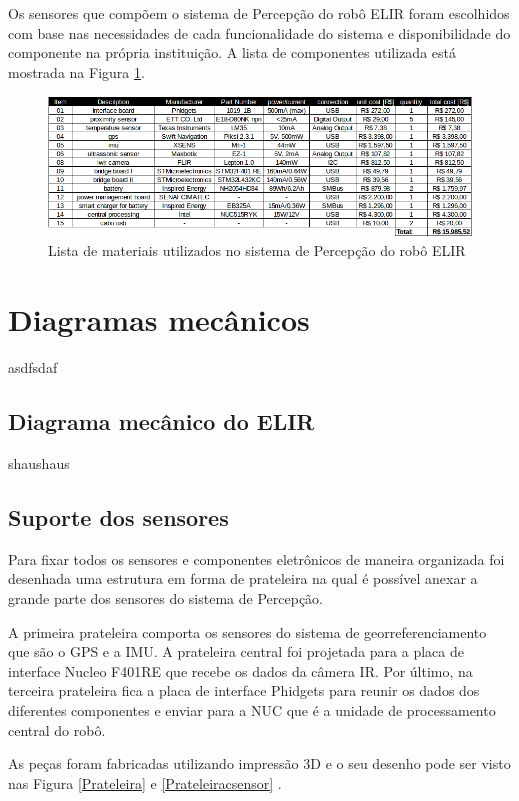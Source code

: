 Os sensores que compõem o sistema de Percepção do robô ELIR foram escolhidos com base nas necessidades de cada funcionalidade do sistema e disponibilidade do componente na própria instituição. A lista de componentes utilizada está mostrada na Figura \ref{fig:list_mat}.

\begin{figure}[H]
	\centering
	\includegraphics[width=16cm]{Figures/lista_materiais.png}
	\caption{Lista de materiais utilizados no sistema de Percepção do robô ELIR}
	\label{fig:list_mat}
\end{figure}


\section{Diagramas mecânicos}
\label{sec:diagm}
asdfsdaf

\subsection{Diagrama mecânico do ELIR}
shaushaus

\subsection{Suporte dos sensores}

Para  fixar  todos  os  sensores  e  componentes  eletrônicos  de  maneira  organizada foi desenhada uma estrutura em forma de prateleira  na qual é possível anexar a grande parte dos sensores do sistema de Percepção.

 A primeira prateleira comporta os sensores do sistema de georreferenciamento que são o GPS e a IMU. A prateleira central foi projetada para a placa de interface Nucleo F401RE que recebe os dados da câmera IR. Por último, na terceira prateleira fica a placa de interface Phidgets para reunir os dados dos diferentes componentes e enviar para a NUC que é a  unidade de processamento central do robô.

As peças foram fabricadas utilizando impressão 3D e o seu desenho pode ser visto nas Figura \ref{Prateleira} e \ref{Prateleiracsensor} .

